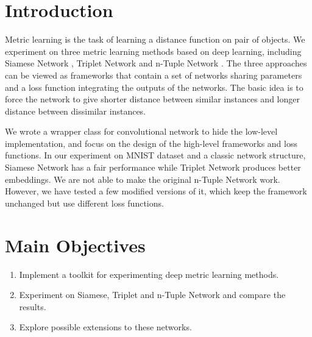 \documentclass[a0,portrait]{a0poster}
\begin{document}
	\begin{multicols}{2} %
		
		
		\color{SaddleBrown} %
		
		\section*{Introduction}
		Metric learning is the task of learning a distance function on pair of objects. We experiment on three metric learning methods based on deep learning, including Siamese Network \cite{hadsell2006dimensionality}, Triplet Network \cite{DBLP:journals/corr/HofferA14} and n-Tuple Network \cite{sohn2016improved}. The three approaches can be viewed as frameworks that contain a set of networks sharing parameters and a loss function integrating the outputs of the networks. The basic idea is to force the network to give shorter distance between similar instances and longer distance between dissimilar instances.
		
		We wrote a wrapper class for convolutional network to hide the low-level implementation, and focus on the design of the high-level frameworks and loss functions. In our experiment on MNIST dataset and a classic network structure, Siamese Network has a fair performance while Triplet Network produces better embeddings. We are not able to make the original n-Tuple Network work. However, we have tested a few modified versions of it, which keep the framework unchanged but use different loss functions.
		
		
		\color{DarkSlateGray} %
		
		\section*{Main Objectives}
		
		\begin{enumerate}
			\item Implement a toolkit for experimenting deep metric learning methods.
			\item Experiment on Siamese, Triplet and n-Tuple Network and compare the results.
			\item Explore possible extensions to these networks.
		\end{enumerate}
		

\end{multicols}
\end{document}
